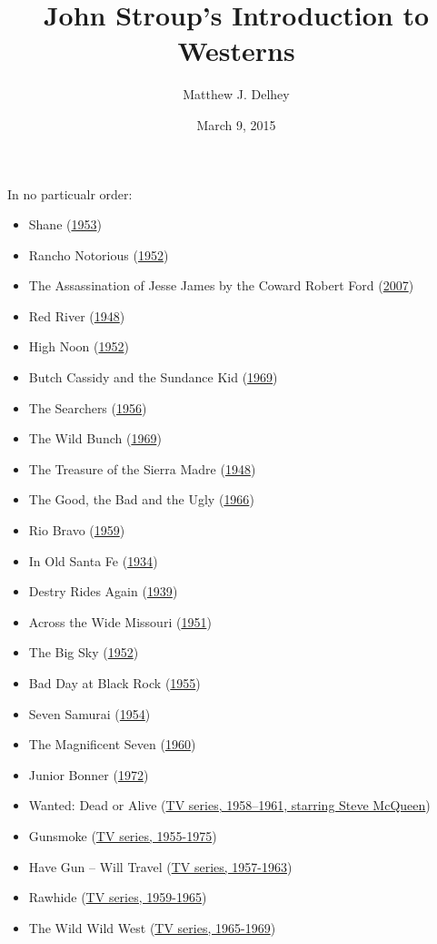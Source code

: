 \documentclass[11pt]{article}
\author{Matthew J. Delhey}
\date{March 9, 2015}
\title{John Stroup's Introduction to Westerns}
\begin{document}
\maketitle
In no particualr order:

\begin{itemize}
\item Shane (\href{https://www.imdb.com/title/tt0046303/}{1953})
\item Rancho Notorious (\href{https://www.imdb.com/title/tt0045070/}{1952})
\item The Assassination of Jesse James by the Coward Robert Ford (\href{https://www.imdb.com/title/tt00443680/}{2007})
\item Red River (\href{https://www.imdb.com/title/tt0040724/}{1948})
\item High Noon (\href{https://www.imdb.com/title/tt0044706/}{1952})
\item Butch Cassidy and the Sundance Kid (\href{https://www.imdb.com/title/tt0064115/}{1969})
\item The Searchers (\href{https://www.imdb.com/title/tt0049730/}{1956})
\item The Wild Bunch (\href{https://www.imdb.com/title/tt0065214/}{1969})
\item The Treasure of the Sierra Madre (\href{https://www.imdb.com/title/tt0040897/}{1948})
\item The Good, the Bad and the Ugly (\href{https://www.imdb.com/title/tt0060196/}{1966})
\item Rio Bravo (\href{https://www.imdb.com/title/tt0053221/}{1959})
\item In Old Santa Fe (\href{https://www.imdb.com/title/tt0025303/}{1934})
\item Destry Rides Again (\href{https://www.imdb.com/title/tt0031225/}{1939})
\item Across the Wide Missouri (\href{https://www.imdb.com/title/tt0043262/}{1951})
\item The Big Sky (\href{https://www.imdb.com/title/tt0044419/}{1952})
\item Bad Day at Black Rock (\href{https://www.imdb.com/title/tt0047849/}{1955})
\item Seven Samurai (\href{https://www.imdb.com/title/tt0047478/}{1954})
\item The Magnificent Seven (\href{https://www.imdb.com/title/tt0054047/}{1960})
\item Junior Bonner (\href{https://www.imdb.com/title/tt0068786/}{1972})
\item Wanted: Dead or Alive (\href{https://www.imdb.com/title/tt0051327/}{TV series, 1958–1961, starring Steve McQueen})
\item Gunsmoke (\href{https://www.imdb.com/title/tt0047736/}{TV series, 1955-1975})
\item Have Gun – Will Travel (\href{https://www.imdb.com/title/tt0050025/}{TV series, 1957-1963})
\item Rawhide (\href{https://www.imdb.com/title/tt0052504/}{TV series, 1959-1965})
\item The Wild Wild West (\href{https://www.imdb.com/title/tt0058855/}{TV series, 1965-1969})
\end{itemize}
\end{document}
